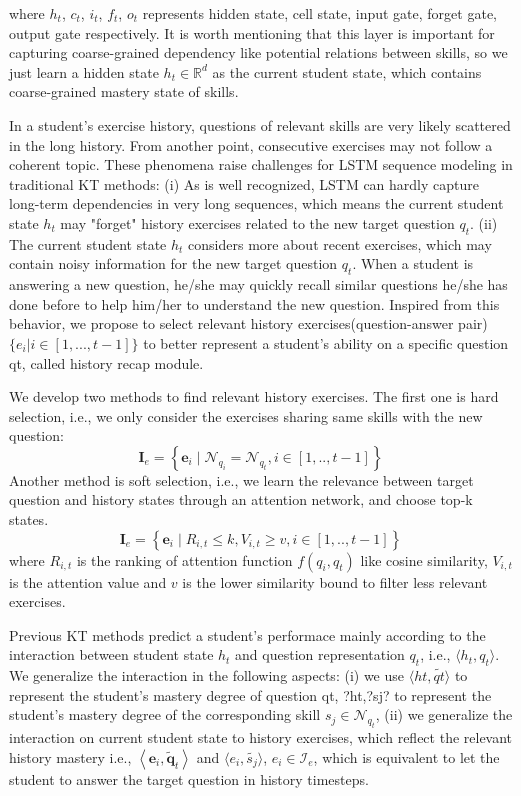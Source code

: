 \documentclass[11pt,en]{elegantpaper}
\begin{document}
where $h_t$, $c_t$, $i_t$, $f_t$, $o_t$ represents hidden state, cell state, input gate, forget gate, output gate respectively. It is worth mentioning that this layer is important for capturing coarse-grained dependency like potential relations between skills, so we just learn a hidden state $h_t ∈ \mathbb{R}^d$ as the current student state, which contains coarse-grained mastery state of skills.

In a student's exercise history, questions of relevant skills are very likely scattered in the long history. From another point, consecutive exercises may not follow a coherent topic. These phenomena raise challenges for LSTM sequence modeling in traditional KT methods: (i) As is well recognized, LSTM can hardly capture long-term dependencies in very long sequences, which means the current student state $h_t$ may "forget" history exercises related to the new target question $q_t$. (ii) The current student state $h_t$ considers more about recent exercises, which may contain noisy information for the new target question $q_t$. When a student is answering a new question, he/she may quickly recall similar questions he/she has done before to help him/her to understand the new question. Inspired from this behavior, we propose to select relevant history exercises(question-answer pair) $\{e_i|i \in [1, . . . , t − 1]\}$ to better represent a student’s ability on a specific question qt, called history recap module.

We develop two methods to find relevant history exercises. The first one is hard selection, i.e., we only consider the exercises sharing same skills with the new question:
$$
\mathbf{I}_{e}=\left\{\mathbf{e}_{i} \mid \mathcal{N}_{q_{i}}=\mathcal{N}_{q_{t}}, i \in [1, . ., t-1]\right\}
$$
Another method is soft selection, i.e., we learn the relevance between target question and history states through an attention network, and choose top-k states. 
$$
\mathbf{I}_{e}=\left\{\mathbf{e}_{i} \mid R_{i, t} \leq k, V_{i, t} \geq v, i \in[1, . ., t-1]\right\}
$$
where $R_{i,t}$ is the ranking of attention function $f(q_i, q_t)$ like cosine similarity, $V_{i,t}$ is the attention value and $v$ is the lower similarity bound to filter less relevant exercises.

Previous KT methods predict a student’s performace mainly according to the interaction between student state $h_t$ and question representation $q_t$, i.e., $\langle h_t, q_t\rangle$. We generalize the interaction in the following aspects: (i) we use $\langle ht, \widetilde{qt}\rangle$ to represent the student's mastery degree of question qt, ?ht,?sj? to represent the student’s mastery degree of the corresponding skill $s_{j} \in \mathcal{N}_{q_{t}}$, (ii) we generalize the interaction on current student state to history exercises, which reflect the relevant history mastery i.e., $\left\langle\mathbf{e}_{i}, \widetilde{\mathbf{q}}_{t}\right\rangle$ and $\langle e_i,\widetilde{s_j}\rangle$, $e_i \in\mathcal{I}_e$, which is equivalent to let the student to answer the target question in history timesteps. 
\end{document}
